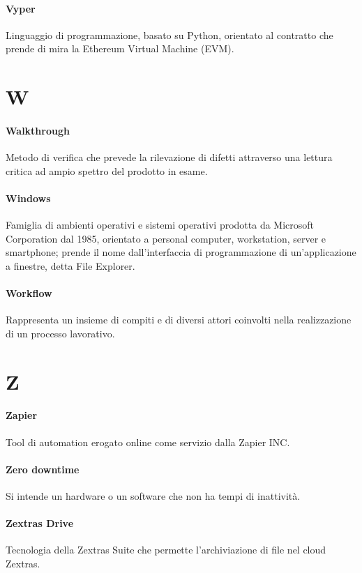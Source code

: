 \documentclass[]{article}
\begin{document}
	\paragraph*{Vyper}
	Linguaggio di programmazione, basato su Python, orientato al contratto che prende di mira la Ethereum Virtual Machine (EVM).
	
	\newpage
	
	\section*{W}
	
	\paragraph*{Walkthrough}
	Metodo di verifica che prevede la rilevazione di difetti attraverso una lettura critica ad ampio spettro del prodotto in esame.
	
	\paragraph*{Windows}
	Famiglia di ambienti operativi e sistemi operativi prodotta da Microsoft Corporation dal 1985, orientato a personal computer, workstation, server e smartphone; prende il nome dall'interfaccia di programmazione di un'applicazione a finestre, detta File Explorer.
	
	\paragraph*{Workflow}
	Rappresenta un insieme di compiti e di diversi attori coinvolti nella realizzazione di un processo lavorativo.
	
	\newpage
	
	\section*{Z}
	
	\paragraph*{Zapier}
	Tool di automation erogato online come servizio dalla Zapier INC.
	
	\paragraph*{Zero downtime}
	Si intende un hardware o un software che non ha tempi di inattività.
	
	\paragraph*{Zextras Drive}
	Tecnologia della Zextras Suite che permette l'archiviazione di file nel cloud Zextras.
\end{document}
